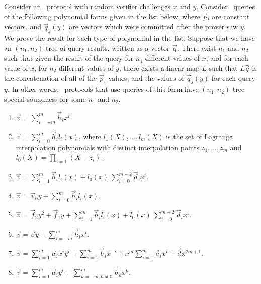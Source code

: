 \begin{lemma}\label{lem:linextract}
Consider an \ILC\ protocol with random verifier challenges $x$ and $y$. Consider \ILC\ queries of the following polynomial forms given in the list below, where $\vec{p}_i$ are constant vectors, and $\vec{q}_j(y)$ are vectors which were committed after the prover saw $y$. We prove the result for each type of polynomial in the list. Suppose that we have an $(n_1,n_2)$-tree of query results, written as a vector $\vec{q}$. There exist $n_1$ and $n_2$ such that given the result of the query for $n_1$ different values of $x$, and for each value of $x$, for $n_2$ different values of $y$, there exists a linear map $L$ such that $L \vec{q}$ is the concatenation of all of the $\vec{p}_i$ values, and the values of $\vec{q}_j(y)$ for each query $y$. In other words, \ILC\ protocols that use queries of this form have $(n_1,n_2)$-tree special soundness for some $n_1$ and $n_2$.
\begin{enumerate}
\item $\vec{v} = \sum_{i=-m}^m \vec{h}_i x^i$.
\item $\vec{v} = \sum_{i=0}^m \vec{h}_i l_i(x)$, where $l_1(X),\ldots,l_m(X)$ is the set of Lagrange interpolation polynomials with distinct interpolation points $z_1,\ldots,z_m$ and $l_0(X) = \prod_{i=1}(X-z_i)$.
\item $\vec{v} = \sum_{i=1}^m \vec{h}_i l_i(x) + l_0(x) \ \sum_{i=0}^{m-2} \vec{d}_i x^i$.
\item $\vec{v} = \vec{v}_0 y + \sum_{i=0}^m \vec{h}_i l_i(x)$.
\item $\vec{v} = \vec{f}_2 y^2 + \vec{f}_1 y + \sum_{i=1}^m \vec{h}_i l_i(x) + l_0(x) \ \sum_{i=0}^{m-2} \vec{d}_i x^i$.
\item $\vec{v} = \vec{e} y + \sum_{i=-m}^m \vec{h}_i x^i$.
\item $\vec{v} = \sum_{i=1}^m \vec{a}_{i}x^{i} y^i+\sum_{i=1}^m\vec{b}_{i} x^{-i}+x^m \sum_{i=1}^m\vec{c}_{i} x^{i}+\vec{d}x^{2m+1}$.
\item $\vec{v} = \sum_{i=1}^m \vec{a}_i y^i + \sum_{k=-m,k\neq0}^m \vec{b}_k x^k$.
\end{enumerate}
\end{lemma}

